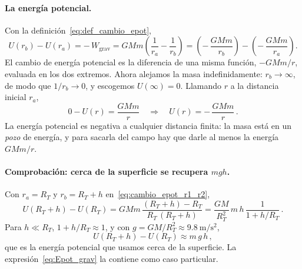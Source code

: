 \paragraph{La energía potencial.}
Con la definición~\eqref{eq:def_cambio_epot},
\begin{equation}
  U(r_{b}) - U(r_{a})
  = -\,W_{\text{grav}}
  = GMm\left(\frac{1}{r_{a}} - \frac{1}{r_{b}}\right)
  = \left(-\,\frac{GMm}{r_{b}}\right) - \left(-\,\frac{GMm}{r_{a}}\right) .
  \label{eq:cambio_epot_r1_r2}
\end{equation}
El cambio de energía potencial es la diferencia de una misma función,
$-GMm/r$, evaluada en los dos extremos. Ahora alejamos la masa
indefinidamente: $r_{b} \to \infty$, de modo que $1/r_{b} \to 0$, y escogemos
$U(\infty) = 0$. Llamando $r$ a la distancia inicial $r_{a}$,
\begin{equation}
  0 - U(r) = \frac{GMm}{r}
  \quad\Longrightarrow\quad
  \boxed{U(r) = -\,\frac{GMm}{r}} \,.
  \label{eq:Epot_grav}
\end{equation}
La energía potencial es negativa a cualquier distancia finita: la masa está en
un \emph{pozo} de energía, y para sacarla del campo hay que darle al menos la
energía $GMm/r$.

\paragraph{Comprobación: cerca de la superficie se recupera $mgh$.}
Con $r_{a} = R_{T}$ y $r_{b} = R_{T} + h$ en~\eqref{eq:cambio_epot_r1_r2},
\begin{equation}
  U(R_{T} + h) - U(R_{T})
  = GMm\,\frac{(R_{T} + h) - R_{T}}{R_{T}\,(R_{T} + h)}
  = \frac{GM}{R_{T}^{2}}\,m\,h\,\frac{1}{1 + h/R_{T}} \,.
  \label{eq:epot_cerca_exacta}
\end{equation}
Para $h \ll R_{T}$, $1 + h/R_{T} \approx 1$, y con
$g = GM/R_{T}^{2} \approx \SI{9.8}{\meter\per\second\squared}$,
\begin{equation}
  U(R_{T} + h) - U(R_{T}) \approx m\,g\,h \,,
  \label{eq:epot_cerca_mgh}
\end{equation}
que es la energía potencial que usamos cerca de la superficie. La
expresión~\eqref{eq:Epot_grav} la contiene como caso particular.
